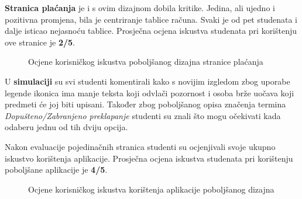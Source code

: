 \documentclass[times, utf8, zavrsni, numeric]{fer}
\begin{document}
        \textbf{Stranica plaćanja} je i s ovim dizajnom dobila kritike. Jedina, ali ujedno i pozitivna promjena, bila je centriranje tablice računa. Svaki je od pet studenata i dalje isticao nejasnoću tablice. Prosječna ocjena iskustva studenata pri korištenju ove stranice je \textbf{2/5}.
        
        \begin{figure} [H]
          \centering
          \caption{Ocjene korisničkog iskustva poboljšanog dizajna stranice plaćanja}
        \end{figure}
        
        U \textbf{simulaciji} su svi studenti komentirali kako s novijim izgledom zbog uporabe legende ikonica ima manje teksta koji odvlači pozornost i osoba brže uočava koji predmeti će joj biti upisani. Također zbog poboljšanog opisa značenja termina \textit{Dopušteno/Zabranjeno preklapanje} studenti su znali što mogu očekivati kada odaberu jednu od tih dviju opcija.
        
        Nakon evaluacije pojedinačnih stranica studenti su ocjenjivali svoje ukupno iskustvo korištenja aplikacije. Prosječna ocjena iskustva studenata pri korištenju poboljšane aplikacije je \textbf{4/5}.
        
        \begin{figure} [H]
          \centering
          \caption{Ocjene korisničkog iskustva korištenja aplikacije poboljšanog dizajna}
        \end{figure}
        
\end{document}
